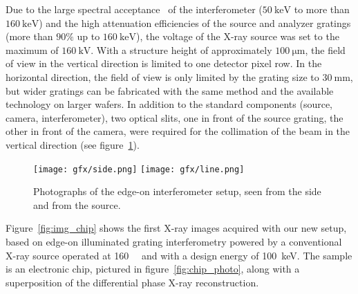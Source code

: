 Due to the large spectral acceptance~\parencite{Weitkamp2005,Thuering2013c} of the
interferometer ($\SI{50}{\kilo\electronvolt}$ to
more than $\SI{160}{\kilo\electronvolt}$) and the high attenuation efficiencies of
the source and analyzer gratings (more than $90\%$ up to
$\SI{160}{\kilo\electronvolt}$), the voltage of the X-ray source was set to
the maximum of $\SI{160}{\kilo\volt}$. With a structure height of
approximately $\SI{100}{\micro\metre}$, the field of view in the vertical
direction is limited to one detector pixel row. In the horizontal direction,
the field of view is only limited by the grating size to
$\SI{30}{\milli\metre}$, but wider gratings can be fabricated with the same
method and the available technology on larger wafers. In addition to the standard components (source,
camera, interferometer), two optical slits, one in front of the source
grating, the other in front of the camera, were required for the collimation
of the beam in the vertical direction (see figure~\ref{fig:edge.on.photos}). 

\begin{figure}[ht]
    \centering
    \texttt{[image: gfx/side.png]}
    \texttt{[image: gfx/line.png]}
    \caption{Photographs of the edge-on interferometer setup, seen
    from the side and from the source.}\label{fig:edge.on.photos}
\end{figure}

Figure~\ref{fig:img_chip} shows the first X-ray images acquired with our new setup, based on
edge-on illuminated grating interferometry powered by a conventional X-ray
source operated at \SI{160}{\kilo\voltpeak} and with a design energy of
\SI{100}{\kilo\eV}. The sample is an electronic chip, pictured in
figure~\ref{fig:chip_photo}, along with a superposition of the differential
phase X-ray reconstruction.

